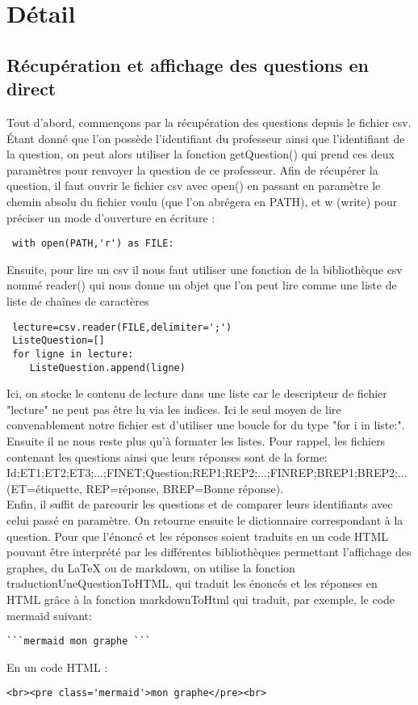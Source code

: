 \documentclass[a4paper, 12pt]{article}
\begin{document}
\newpage
    
\section{Détail}

\subsection{Récupération et affichage des questions en direct}

Tout d'abord, commençons par la récupération des questions depuis le fichier csv. 
Étant donné que l'on possède l'identifiant du professeur ainsi que l'identifiant de la question, on peut alors utiliser la fonction getQuestion() qui prend ces deux paramètres pour renvoyer la question de ce professeur. 
Afin de récupérer la question, il faut ouvrir le fichier csv avec open() en passant en paramètre le chemin absolu du fichier voulu (que l'on abrégera en PATH), et w (write) pour préciser un mode d'ouverture en écriture : 

\begin{lstlisting}
 with open(PATH,'r') as FILE:
\end{lstlisting}

Ensuite, pour lire un csv il nous faut utiliser une fonction de la bibliothèque
csv nommé reader() qui nous donne un objet que l'on peut lire comme une liste de 
liste de chaînes de caractères

\begin{lstlisting}
 lecture=csv.reader(FILE,delimiter=';')
 ListeQuestion=[]
 for ligne in lecture:
    ListeQuestion.append(ligne)
\end{lstlisting}

Ici, on stocke le contenu de lecture dans une liste car le descripteur de fichier "lecture"
ne peut pas être lu via les indices. 
Ici le seul moyen de lire convenablement notre fichier est d'utiliser une boucle for du type "for i in liste:". \\
Ensuite il ne nous reste plus qu'à formater les listes. 
Pour rappel, les fichiers contenant les questions ainsi que leurs réponses sont de la forme: \\
Id;ET1;ET2;ET3;...;FINET;Question;REP1;REP2;...;FINREP;BREP1;BREP2;...\\
(ET=étiquette, REP=réponse, BREP=Bonne réponse).\\
Enfin, il suffit de parcourir les questions et de comparer leurs identifiants avec celui passé en paramètre. 
On retourne ensuite le dictionnaire correspondant à la question. 
Pour que l'énoncé et les réponses soient traduits en un code HTML pouvant être interprété par les différentes bibliothèques permettant l'affichage des graphes, du LaTeX ou de markdown, on utilise la fonction traductionUneQuestionToHTML, qui traduit les énoncés et les réponses en HTML grâce à la fonction markdownToHtml qui traduit, par exemple, le code mermaid suivant: 
\begin{lstlisting}
```mermaid mon graphe ```
\end{lstlisting}
En un code HTML :
\begin{lstlisting}
<br><pre class='mermaid'>mon graphe</pre><br>
\end{lstlisting}
\end{document}
